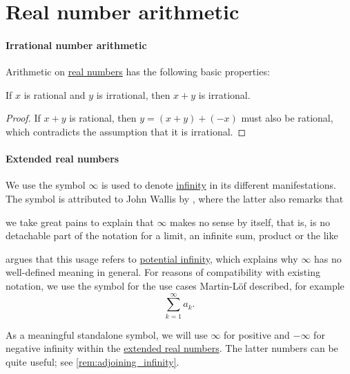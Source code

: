 \section{Real number arithmetic}\label{sec:real_number_arithmetic}

\paragraph{Irrational number arithmetic}

\begin{proposition}\label{thm:real_number_arithmetic}
  Arithmetic on \hyperref[def:real_numbers]{real numbers} has the following basic properties:
  \begin{thmenum}
     If \( x \) is rational and \( y \) is irrational, then \( x + y \) is irrational.
  \end{thmenum}
\end{proposition}
\begin{proof}
   If \( x + y \) is rational, then \( y = (x + y) + (-x) \) must also be rational, which contradicts the assumption that it is irrational.
\end{proof}

\paragraph{Extended real numbers}

\begin{remark}\label{rem:lemniscate_symbol}
  We use the  symbol \( \infty \) is used to denote \hyperref[con:transfinitum]{infinity} in its different manifestations. The symbol is attributed to John Wallis by , where the latter also remarks that
  \begin{displayquote}
    \textellipsis we take great pains to explain that \( \infty \) makes no sense by itself, that is, is no detachable part of the notation for a limit, an infinite sum, product or the like \textellipsis
  \end{displayquote}

   argues that this usage refers to \hyperref[con:transfinitum]{potential infinity}, which explains why \( \infty \) has no well-defined meaning in general. For reasons of compatibility with existing notation, we use the symbol for the use cases Martin-L\"of described, for example
  \begin{equation*}
    \sum_{k=1}^\infty a_k.
  \end{equation*}

  As a meaningful standalone symbol, we will use \( \infty \) for positive and \( -\infty \) for negative infinity within the \hyperref[def:extended_real_numbers]{extended real numbers}. The latter numbers can be quite useful; see \cref{rem:adjoining_infinity}.
\end{remark}

